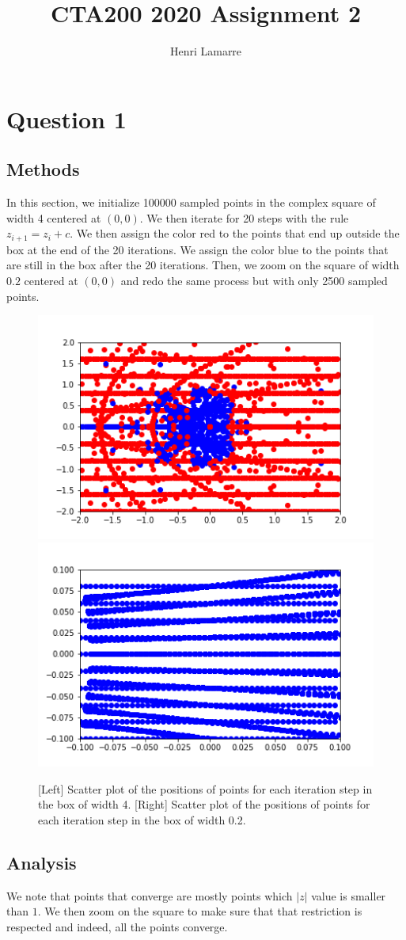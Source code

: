 \documentclass{article}
\title{CTA200 2020 Assignment 2}
\author{Henri Lamarre}
\date{}
\begin{document}
\maketitle

\section{Question 1}
\subsection{Methods}
In this section, we initialize 100000 sampled points in the complex square of width 4 centered at $(0,0)$. We then iterate for 20 steps with the rule $z_{i+1}=z_i+c$. We then assign the color red to the points that end up outside the box at the end of the 20 iterations. We assign the color blue to the points that are still in the box after the 20 iterations. Then, we zoom on the square of width $0.2$ centered at $(0,0)$ and redo the same process but with only 2500 sampled points.

\begin{figure}[h]
\includegraphics[width = 0.5\columnwidth]{question1_1.png}
\includegraphics[width = 0.5\columnwidth]{question1_2.png}
\caption{[Left] Scatter plot of the positions of points for each iteration step in the box of width 4. [Right] Scatter plot of the positions of points for each iteration step in the box of width 0.2.}
\end{figure}


\subsection{Analysis}
We note that points that converge are mostly points which $|z|$ value is smaller than $1$. We then zoom on the square to make sure that that restriction is respected and indeed, all the points converge.
\end{document}
